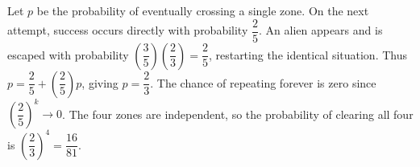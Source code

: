 Let $p$ be the probability of eventually crossing a single zone. On the next attempt, success occurs directly with probability $\dfrac{2}{5}$. An alien appears and is escaped with probability $(\dfrac{3}{5})(\dfrac{2}{3})=\dfrac{2}{5}$, restarting the identical situation. Thus $p=\dfrac{2}{5}+(\dfrac{2}{5})p$, giving $p=\dfrac{2}{3}$. The chance of repeating forever is zero since $(\dfrac{2}{5})^k\to 0$. The four zones are independent, so the probability of clearing all four is $(\dfrac{2}{3})^4=\boxed{\dfrac{16}{81}}$.
